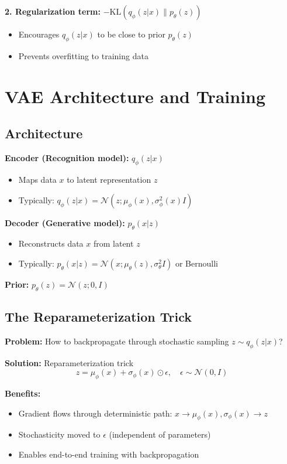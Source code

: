 \textbf{2. Regularization term:} $-\text{KL}(q_\phi(z|x) \| p_\theta(z))$
\begin{itemize}
    \item Encourages $q_\phi(z|x)$ to be close to prior $p_\theta(z)$
    \item Prevents overfitting to training data
\end{itemize}

\section{VAE Architecture and Training}

\subsection{Architecture}

\textbf{Encoder (Recognition model):} $q_\phi(z|x)$
\begin{itemize}
    \item Maps data $x$ to latent representation $z$
    \item Typically: $q_\phi(z|x) = \mathcal{N}(z; \mu_\phi(x), \sigma_\phi^2(x)I)$
\end{itemize}

\textbf{Decoder (Generative model):} $p_\theta(x|z)$
\begin{itemize}
    \item Reconstructs data $x$ from latent $z$
    \item Typically: $p_\theta(x|z) = \mathcal{N}(x; \mu_\theta(z), \sigma_\theta^2 I)$ or Bernoulli
\end{itemize}

\textbf{Prior:} $p_\theta(z) = \mathcal{N}(z; 0, I)$

\subsection{The Reparameterization Trick}

\textbf{Problem:} How to backpropagate through stochastic sampling $z \sim q_\phi(z|x)$?

\textbf{Solution:} Reparameterization trick
\begin{equation}
    z = \mu_\phi(x) + \sigma_\phi(x) \odot \epsilon, \quad \epsilon \sim \mathcal{N}(0, I)
\end{equation}

\textbf{Benefits:}
\begin{itemize}
    \item Gradient flows through deterministic path: $x \to \mu_\phi(x), \sigma_\phi(x) \to z$
    \item Stochasticity moved to $\epsilon$ (independent of parameters)
    \item Enables end-to-end training with backpropagation
\end{itemize}

